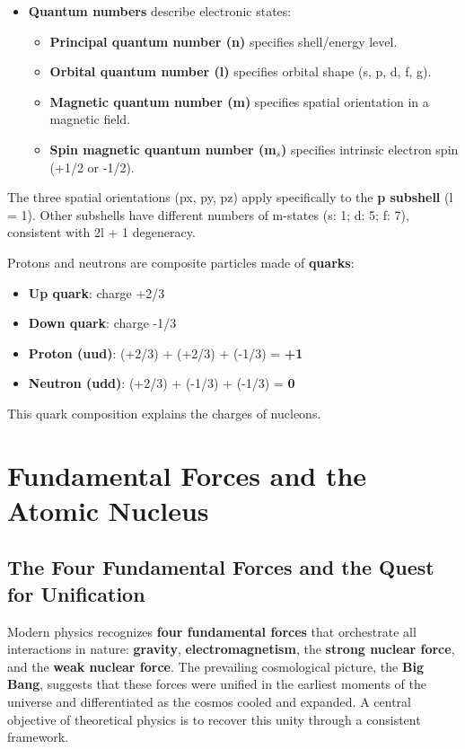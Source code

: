 \documentclass[11pt,a4paper]{article}
\let\originalsection\section
\renewcommand{\section}{\Needspace{7\baselineskip}\originalsection}
\let\originalsubsection\subsection
\renewcommand{\subsection}{\Needspace{8\baselineskip}\originalsubsection}
\begin{document}
\begin{itemize}
\item \textbf{Quantum numbers} describe electronic states:
\begin{itemize}
\item \textbf{Principal quantum number (n)} specifies shell/energy level.
\item \textbf{Orbital quantum number (l)} specifies orbital shape (s, p, d, f, g).
\item \textbf{Magnetic quantum number (m)} specifies spatial orientation in a magnetic field.
\item \textbf{Spin magnetic quantum number (m\ensuremath{{}_{s}})} specifies intrinsic electron spin (+1/2 or -1/2).
\end{itemize}
\end{itemize}
The three spatial orientations (px, py, pz) apply specifically to the \textbf{p subshell} (l = 1). Other subshells have different numbers of m-states (s: 1; d: 5; f: 7), consistent with 2l + 1 degeneracy.

Protons and neutrons are composite particles made of \textbf{quarks}:

\begin{itemize}
\item \textbf{Up quark}: charge +2/3
\item \textbf{Down quark}: charge -1/3
\item \textbf{Proton (uud)}: (+2/3) + (+2/3) + (-1/3) = \textbf{+1}
\item \textbf{Neutron (udd)}: (+2/3) + (-1/3) + (-1/3) = \textbf{0}
\end{itemize}
This quark composition explains the charges of nucleons.


\clearpage
\section{Fundamental Forces and the Atomic Nucleus}
\subsection{The Four Fundamental Forces and the Quest for Unification}
Modern physics recognizes \textbf{four fundamental forces} that orchestrate all interactions in nature: \textbf{gravity}, \textbf{electromagnetism}, the \textbf{strong nuclear force}, and the \textbf{weak nuclear force}. The prevailing cosmological picture, the \textbf{Big Bang}, suggests that these forces were unified in the earliest moments of the universe and differentiated as the cosmos cooled and expanded. A central objective of theoretical physics is to recover this unity through a consistent framework.
\end{document}
